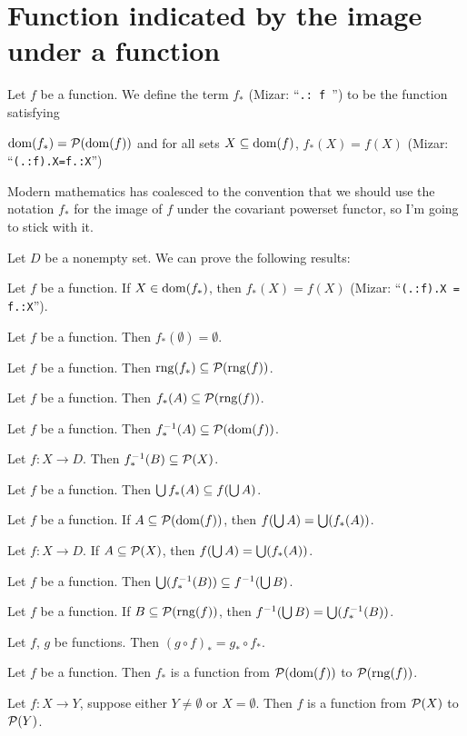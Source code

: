 \documentclass{article}
\begin{document}
\section{Function indicated by the image under a function}

\begin{definition}
Let $f$ be a function.
We define the term $f_{*}$ (Mizar: ``\verb#.: f #'') to be the function satisfying
\begin{defn}
\item $\operatorname{dom}(f_{*})=\mathcal{P}(\operatorname{dom}(f))$ and
  for all sets $X\subseteq\operatorname{dom}(f)$, $f_{*}(X)=f(X)$ (Mizar: ``\verb#(.:f).X=f.:X#'')
\end{defn}
\end{definition}

\begin{remark}
Modern mathematics has coalesced to the convention that we should use
the notation $f_{*}$ for the image of $f$ under the covariant powerset
functor, so I'm going to stick with it.
\end{remark}

Let $D$ be a nonempty set.
We can prove the following results:
\begin{thm}
\item\label{funct3:7} Let $f$ be a function. If $X\in\operatorname{dom}(f_{*})$,
  then $f_{*}(X)=f(X)$ (Mizar: ``\verb#(.:f).X = f.:X#'').
\item\label{funct3:8} Let $f$ be a function. Then $f_{*}(\emptyset)=\emptyset$.
\item\label{funct3:9} Let $f$ be a function. Then $\operatorname{rng}(f_{*})\subseteq\mathcal{P}(\operatorname{rng}(f))$.
\item\label{funct3:10} Let $f$ be a function. Then $f_{*}(A)\subseteq\mathcal{P}(\operatorname{rng}(f))$.
\item\label{funct3:11} Let $f$ be a function. Then $f_{*}^{-1}(A)\subseteq\mathcal{P}(\operatorname{dom}(f))$.
\item\label{funct3:12} Let $f\colon X\to D$. Then $f_{*}^{-1}(B)\subseteq\mathcal{P}(X)$.
\item\label{funct3:13} Let $f$ be a function. Then $\bigcup f_{*}(A)\subseteq f(\bigcup A)$.
\item\label{funct3:14} Let $f$ be a function. If $A\subseteq\mathcal{P}(\operatorname{dom}(f))$,
  then $f(\bigcup A)=\bigcup(f_{*}(A))$.
\item\label{funct3:15} Let $f\colon X\to D$. If $A\subseteq\mathcal{P}(X)$,
  then $f(\bigcup A)=\bigcup(f_{*}(A))$.
\item\label{funct3:16} Let $f$ be a function.
  Then $\bigcup(f_{*}^{-1}(B))\subseteq f^{-1}(\bigcup B)$.
\item\label{funct3:17} Let $f$ be a function.
  If $B\subseteq\mathcal{P}(\operatorname{rng}(f))$,
  then $f^{-1}(\bigcup B)=\bigcup(f_{*}^{-1}(B))$.
\item\label{funct3:18} Let $f$, $g$ be functions.
  Then $(g\circ f)_{*}=g_{*}\circ f_{*}$.
\item\label{funct3:19} Let $f$ be a function.
  Then $f_{*}$ is a function from $\mathcal{P}(\operatorname{dom}(f))$ to $\mathcal{P}(\operatorname{rng}(f))$.
\item\label{funct3:20} Let $f\colon X\to Y$, suppose either $Y\neq\emptyset$
  or $X=\emptyset$.
  Then $f$ is a function from $\mathcal{P}(X)$ to $\mathcal{P}(Y)$.
\end{thm}
\end{document}
